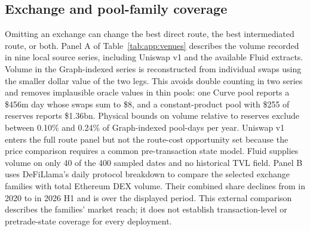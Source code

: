 \FloatBarrier
\begin{table}[tbp]
\centering
\scriptsize
\caption{Gas prediction and path-specific output bounds}
\label{tab:app:gas-adjusted-validation}

\end{table}
\FloatBarrier

\subsection{Exchange and pool-family coverage}

Omitting an exchange can change the best direct route, the best intermediated route, or both. Panel A of Table~\ref{tab:app:venues} describes the volume recorded in nine local source series, including Uniswap v1 and the available Fluid extracts. Volume in the Graph-indexed series is reconstructed from individual swaps using the smaller dollar value of the two legs. This avoids double counting in two series and removes implausible oracle values in thin pools: one Curve pool reports a \$456m day whose swaps sum to \$8, and a constant-product pool with \$255 of reserves reports \$1.36bn. Physical bounds on volume relative to reserves exclude between 0.10\% and 0.24\% of Graph-indexed pool-days per year. Uniswap v1 enters the full route panel but not the route-cost opportunity set because the price comparison requires a common pre-transaction state model. Fluid supplies volume on only 40 of the 400 sampled dates and no historical TVL field. Panel B uses DeFiLlama's daily protocol breakdown to compare the selected exchange families with total Ethereum DEX volume. Their combined share declines from \EthereumMarketCoverageBase{} in 2020 to \EthereumMarketCoverageEnd{} in 2026 H1 and is \EthereumMarketCoveragePooled{} over the displayed period. This external comparison describes the families' market reach; it does not establish transaction-level or pretrade-state coverage for every deployment.

